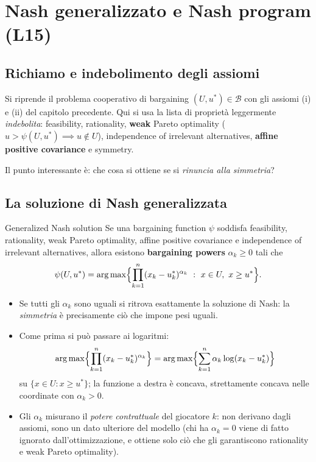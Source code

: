 \documentclass[12pt,a4paper,twoside]{book}
\theoremstyle{plain}
\theoremstyle{definition}
\newcommand{\argmax}{\operatorname*{arg\,max}}
\begin{document}
\chapter{Nash generalizzato e Nash program (L15)}
\label{ch:nash-program}

\section{Richiamo e indebolimento degli assiomi}

Si riprende il problema cooperativo di bargaining $(U,u^*)\in\mathcal{B}$ con gli assiomi (i)
e (ii) del capitolo precedente. Qui si usa la lista di proprietà leggermente \emph{indebolita}:
feasibility, rationality, \textbf{weak} Pareto optimality
($u>\psi(U,u^*)\implies u\notin U$), independence of irrelevant alternatives,
\textbf{affine positive covariance} e symmetry.

Il punto interessante è: che cosa si ottiene se si \emph{rinuncia alla simmetria}?

\section{La soluzione di Nash generalizzata}

\begin{thmbox}{Generalized Nash solution}
Se una bargaining function $\psi$ soddisfa feasibility, rationality, weak Pareto optimality,
affine positive covariance e independence of irrelevant alternatives, allora esistono
\textbf{bargaining powers} $\alpha_k\ge0$ tali che
\[
  \psi(U,u^*)=\argmax\Bigl\{\prod_{k=1}^n(x_k-u^*_k)^{\alpha_k}\ :\ x\in U,\ x\ge u^*\Bigr\}.
\]
\end{thmbox}

\begin{itemize}
  \item Se tutti gli $\alpha_k$ sono uguali si ritrova esattamente la soluzione di Nash: la
        \emph{simmetria} è precisamente ciò che impone pesi uguali.
  \item Come prima si può passare ai logaritmi:
        \[
          \argmax\Bigl\{\prod_{k=1}^n(x_k-u^*_k)^{\alpha_k}\Bigr\}
          =\argmax\Bigl\{\sum_{k=1}^n\alpha_k\log(x_k-u^*_k)\Bigr\}
        \]
        su $\{x\in U : x\ge u^*\}$; la funzione a destra è concava, strettamente concava nelle
        coordinate con $\alpha_k>0$.
  \item Gli $\alpha_k$ misurano il \emph{potere contrattuale} del giocatore $k$: non derivano
        dagli assiomi, sono un dato ulteriore del modello (chi ha $\alpha_k=0$ viene di fatto
        ignorato dall'ottimizzazione, e ottiene solo ciò che gli garantiscono rationality e
        weak Pareto optimality).
\end{itemize}
\end{document}
